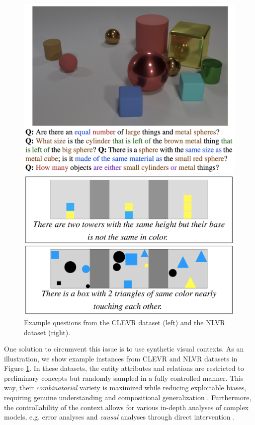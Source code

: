 \begin{figure}[t!]
\centering
\begin{minipage}{.5\textwidth}
  \centering
  \includegraphics[width=.93\textwidth]{clevr_sample.pdf}
\end{minipage}%
\begin{minipage}{.5\textwidth}
  \centering
  \includegraphics[width=.92\textwidth]{nlvr_sample.pdf}
\end{minipage}
\caption{Example questions from the CLEVR dataset \citep{johnson2017clevr} (left) and the NLVR dataset \citep{suhr2017corpus} (right).
}
\label{02_fig:clevr_nlvr_sample}
\end{figure}

One solution to circumvent this issue is to use synthetic visual contexts. As an illustration, we show example instances from CLEVR \citep{johnson2017clevr} and NLVR datasets \citep{suhr2017corpus} in Figure \ref{02_fig:clevr_nlvr_sample}. In these datasets, the entity attributes and relations are restricted to preliminary concepts but randomly sampled in a fully controlled manner. This way, their \textit{combinatorial} variety is maximized while reducing exploitable biases, requiring genuine understanding and compositional generalization \citep{Fodor1988ConnectionismAC,Lake2018GeneralizationWS}. Furthermore, the controllability of the context allows for various in-depth analyses of complex models, e.g. error analyses and \textit{causal} analyses through direct intervention \citep{pearl2009causality,pearl2018book}.

